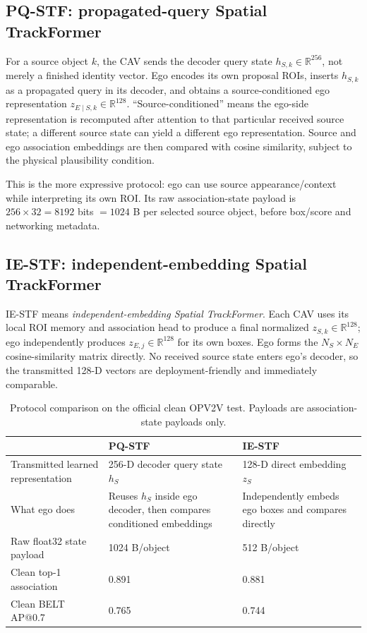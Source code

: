 \documentclass[11pt]{article}
\newcommand{\PQSTF}{\textsc{PQ-STF}}
\newcommand{\IESTF}{\textsc{IE-STF}}
\begin{document}
\subsection{PQ-STF: propagated-query Spatial TrackFormer}

For a source object $k$, the CAV sends the decoder query state $h_{S,k}\in\mathbb{R}^{256}$, not merely a finished identity vector.  Ego encodes its own proposal ROIs, inserts $h_{S,k}$ as a propagated query in its decoder, and obtains a source-conditioned ego representation $z_{E\mid S,k}\in\mathbb{R}^{128}$.  ``Source-conditioned'' means the ego-side representation is recomputed after attention to that particular received source state; a different source state can yield a different ego representation.  Source and ego association embeddings are then compared with cosine similarity, subject to the physical plausibility condition.

This is the more expressive protocol: ego can use source appearance/context while interpreting its own ROI.  Its raw association-state payload is $256\times32=8192$ bits $=1024$ B per selected source object, before box/score and networking metadata.

\subsection{IE-STF: independent-embedding Spatial TrackFormer}

IE-STF means \emph{independent-embedding Spatial TrackFormer}.  Each CAV uses its local ROI memory and association head to produce a final normalized $z_{S,k}\in\mathbb{R}^{128}$; ego independently produces $z_{E,j}\in\mathbb{R}^{128}$ for its own boxes.  Ego forms the $N_S\times N_E$ cosine-similarity matrix directly.  No received source state enters ego's decoder, so the transmitted 128-D vectors are deployment-friendly and immediately comparable.

\begin{table}[h]
\centering
\caption{Protocol comparison on the official clean OPV2V test. Payloads are association-state payloads only.}
\begin{tabular}{p{28mm}p{34mm}p{34mm}}
\toprule
& \PQSTF & \IESTF\\
\midrule
Transmitted learned representation & 256-D decoder query state $h_S$ & 128-D direct embedding $z_S$\\
What ego does & Reuses $h_S$ inside ego decoder, then compares conditioned embeddings & Independently embeds ego boxes and compares directly\\
Raw float32 state payload & 1024 B/object & 512 B/object\\
Clean top-1 association & 0.891 & 0.881\\
Clean BELT AP@0.7 & 0.765 & 0.744\\
\bottomrule
\end{tabular}
\end{table}
\end{document}
